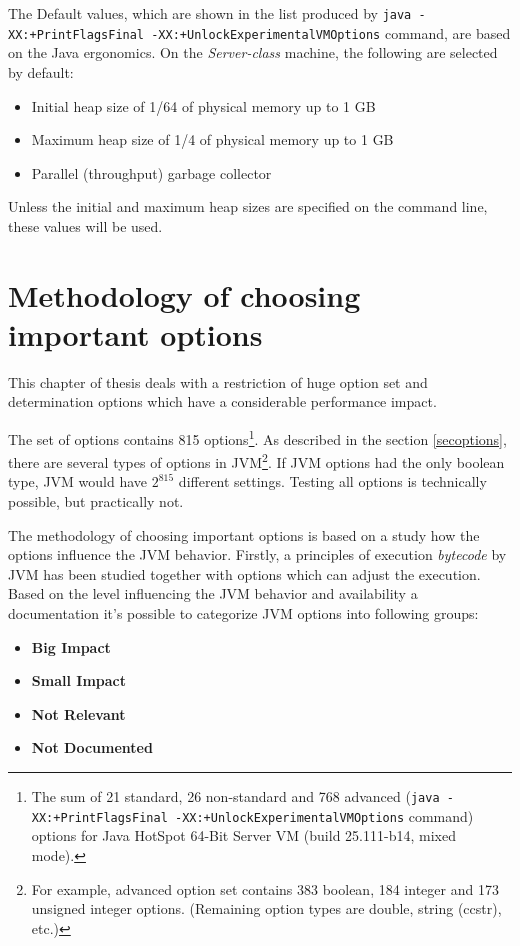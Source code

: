 \documentclass[
  digital, %
  oneside,
  notable, %
  nolof,     %
  nolot     %
]{fithesis3}
\begin{document}
The Default values, which are shown in the list produced by \texttt{java -XX:+PrintFlagsFinal -XX:+UnlockExperimentalVMOptions} command, are based on the Java ergonomics. On the \textit{Server-class} machine, the following are selected by default:
\begin{itemize}
	\item Initial heap size of 1/64 of physical memory up to 1 GB
	\item Maximum heap size of 1/4 of physical memory up to 1 GB
	\item Parallel (throughput) garbage collector
\end{itemize}
Unless the initial and maximum heap sizes are specified on the command line, these values will be used. \cite{ergonomics}


\chapter{Methodology of choosing important options}
This chapter of thesis deals with a restriction of huge option set and determination options which have a considerable performance impact.

The set of options contains 815 options\footnote{The sum of 21 standard, 26 non-standard and 768 advanced (\texttt{java -XX:+PrintFlagsFinal -XX:+UnlockExperimentalVMOptions} command) options for Java HotSpot\texttrademark{} 64-Bit Server VM (build 25.111-b14, mixed mode).}. As described in the section \ref{secoptions}, there are several types of options in JVM\footnote{For example, advanced option set contains 383 boolean, 184 integer and 173 unsigned integer options. (Remaining option types are double, string (ccstr), etc.)}. If JVM options had the only boolean type, JVM would have $2^{815}$ different settings. Testing all options is technically possible, but practically not.


The methodology of choosing important options is based on a study how the options influence the JVM behavior. Firstly, a principles of execution \textit{bytecode} by JVM has been studied together with options which can adjust the execution. Based on the level influencing the JVM behavior and availability a documentation it's possible to categorize JVM options into following groups:
\begin{itemize}
	\item \textbf{Big Impact}
	\item \textbf{Small Impact}
	\item \textbf{Not Relevant}
	\item \textbf{Not Documented}
\end{itemize}
\end{document}
